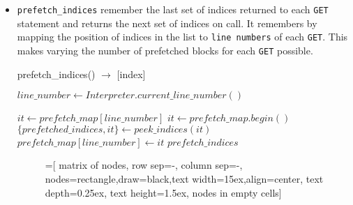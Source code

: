 \begin{itemize}
\item \texttt{prefetch\_indices} remember the last set of indices returned to each
  \texttt{GET} statement and returns the next set of indices on call. It remembers
  by mapping the position of indices in the list to \texttt{line numbers} of each
  \texttt{GET}. This makes varying the number of prefetched blocks for each
  \texttt{GET} possible.

  \begin{algorithm} {prefetch\_indices() $\rightarrow$ [index]}
    \singlespacing

    \begin{algorithmic}[1]
      \State $line\_number \gets Interpreter.current\_line\_number()$

      \State $it \gets prefetch\_map[line\_number]$
      \Else
      \State $it \gets prefetch\_map.begin()$
      \EndIf
      \State $\{prefetched\_indices, it\} \gets peek\_indices(it)$
      \State $prefetch\_map[line\_number] \gets it$
      \State \Return $prefetch\_indices$
      \EndFunction
    \end{algorithmic}
  \end{algorithm}

  \begin{figure}[h] %
    \centering

    =[
    matrix of nodes,
    row sep=-\pgflinewidth,
    column sep=-\pgflinewidth,
    nodes={rectangle,draw=black,text width=15ex,align=center},
    text depth=0.25ex,
    text height=1.5ex,
    nodes in empty cells]
\end{figure}
\end{itemize}
